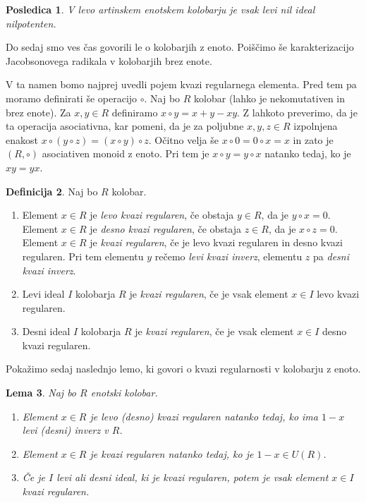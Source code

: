\documentclass[a4paper, 12pt]{amsart}
\theoremstyle{definition} %
\newtheorem{definicija}{Definicija}[section]
\theoremstyle{plain} %
\newtheorem{lema}[definicija]{Lema}
\newtheorem{posledica}[definicija]{Posledica}
\begin{document}
\begin{posledica}
V levo artinskem enotskem kolobarju je vsak levi nil ideal nilpotenten.
\end{posledica}

Do sedaj smo ves čas govorili le o kolobarjih z enoto. Poiščimo še karakterizacijo Jacobsonovega radikala v kolobarjih brez enote. 

V ta namen bomo najprej uvedli pojem kvazi regularnega elementa. Pred tem pa moramo definirati še operacijo $\circ$. Naj bo $R$ kolobar (lahko je nekomutativen in brez enote). Za $x,y\in R$ definiramo $x\circ y = x+y-xy$. Z lahkoto preverimo, da je ta operacija asociativna, kar pomeni, da je za poljubne $x,y,z\in R$ izpolnjena enakost $x\circ(y\circ z) = (x\circ y) \circ z$. Očitno velja še $x \circ 0 = 0 \circ x = x$ in zato je $(R,\circ )$ asociativen monoid z enoto. Pri tem je $x\circ y = y\circ x$ natanko tedaj, ko je $xy = yx$.

\begin{definicija}
Naj bo $R$ kolobar. 
\begin{enumerate}
\item Element $x\in R $ je \emph{levo kvazi regularen}, če obstaja $y\in R$, da je $y\circ x=0$. Element $x\in R$ je \emph{desno kvazi regularen}, če obstaja $z\in R$, da je $x\circ z = 0$. Element $x\in R$ je \emph{kvazi regularen}, če je levo kvazi regularen in desno kvazi regularen. Pri tem elementu $y$ rečemo \emph{levi kvazi inverz}, elementu $z$ pa \emph{desni kvazi inverz}.
\item Levi ideal $I$ kolobarja $R$ je \emph{kvazi regularen}, če je vsak element $x\in I$ levo kvazi regularen.
\item Desni ideal $I$ kolobarja $R$ je \emph{kvazi regularen}, če je vsak element $x\in I$ desno kvazi regularen.
\end{enumerate}
\end{definicija}

Pokažimo sedaj naslednjo lemo, ki govori o kvazi regularnosti v kolobarju z enoto.

\begin{lema}
\label{kvaziRegularen-enotskiR}
Naj bo $R$ enotski kolobar. 
\begin{enumerate}
\item Element $x\in R$ je levo (desno) kvazi regularen natanko tedaj, ko ima $1-x$ levi (desni) inverz v $R$.
\item Element $x\in R$ je kvazi regularen natanko tedaj, ko je $1-x \in U(R)$.
\item Če je $I$ levi ali desni ideal, ki je kvazi regularen, potem je vsak element $x\in I$ kvazi regularen.
\end{enumerate}
\end{lema}
\end{document}
